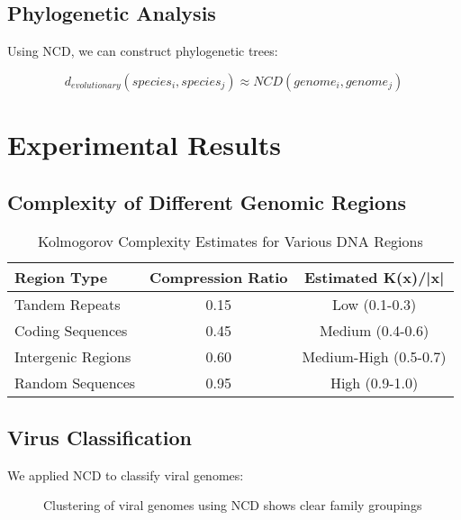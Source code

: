 \documentclass[12pt,a4paper]{report}
\begin{document}
\subsection{Phylogenetic Analysis}

Using NCD, we can construct phylogenetic trees:

\begin{equation}
d_{evolutionary}(species_i, species_j) \approx NCD(genome_i, genome_j)
\end{equation}

\section{Experimental Results}

\subsection{Complexity of Different Genomic Regions}

\begin{table}[h]
\centering
\caption{Kolmogorov Complexity Estimates for Various DNA Regions}
\begin{tabular}{lcc}
\toprule
\textbf{Region Type} & \textbf{Compression Ratio} & \textbf{Estimated K(x)/|x|} \\
\midrule
Tandem Repeats & 0.15 & Low (0.1-0.3) \\
Coding Sequences & 0.45 & Medium (0.4-0.6) \\
Intergenic Regions & 0.60 & Medium-High (0.5-0.7) \\
Random Sequences & 0.95 & High (0.9-1.0) \\
\bottomrule
\end{tabular}
\end{table}

\subsection{Virus Classification}

We applied NCD to classify viral genomes:

\begin{figure}[h]
\centering
{}
\caption{Clustering of viral genomes using NCD shows clear family groupings}
\end{figure}
\end{document}
